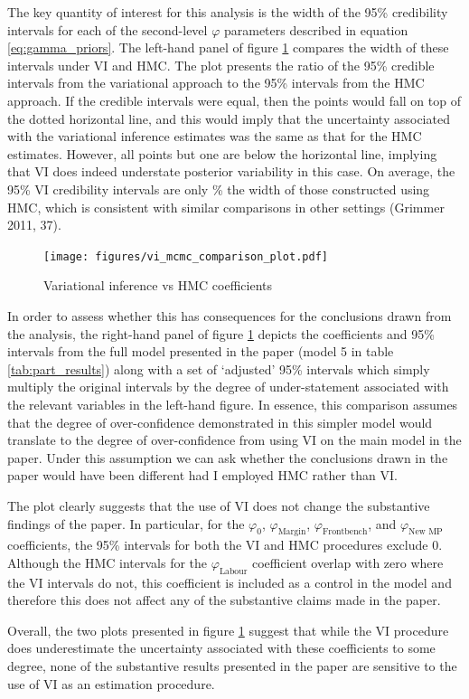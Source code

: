 \documentclass[12pt]{article}
\begin{document}
The key quantity of interest for this analysis is the width of the 95\% credibility intervals for each of the second-level $\varphi$ parameters described in equation \ref{eq:gamma_priors}. The left-hand panel of figure \ref{fig:vi_mcmc} compares the width of these intervals under VI and HMC. The plot presents the ratio of the 95\% credible intervals from the variational approach to the 95\% intervals from the HMC approach. If the credible intervals were equal, then the points would fall on top of the dotted horizontal line, and this would imply that the uncertainty associated with the variational inference estimates was the same as that for the HMC estimates. However, all points but one are below the horizontal line, implying that VI does indeed understate posterior variability in this case. On average, the 95\% VI credibility intervals are only  \% the width of those constructed using HMC, which is consistent with similar comparisons in other settings (Grimmer 2011, 37).

\begin{figure}[h]
\caption{Variational inference vs HMC coefficients}\label{fig:vi_mcmc}
\texttt{[image: figures/vi\_mcmc\_comparison\_plot.pdf]}
\end{figure}

In order to assess whether this has consequences for the conclusions drawn from the analysis, the right-hand panel of figure \ref{fig:vi_mcmc} depicts the coefficients and 95\% intervals from the full model presented in the paper (model 5 in table \ref{tab:part_results}) along with a set of `adjusted' 95\% intervals which simply multiply the original intervals by the degree of under-statement associated with the relevant variables in the left-hand figure. In essence, this comparison assumes that the degree of over-confidence demonstrated in this simpler model would translate to the degree of over-confidence from using VI on the main model in the paper. Under this assumption we can ask whether the conclusions drawn in the paper would have been different had I employed HMC rather than VI.

The plot clearly suggests that the use of VI does not change the substantive findings of the paper. In particular, for the $\varphi_0$, $\varphi_\text{Margin}$, $\varphi_\text{Frontbench}$, and $\varphi_\text{New MP}$ coefficients, the 95\% intervals for both the VI and HMC procedures exclude 0. Although the HMC intervals for the $\varphi_\text{Labour}$ coefficient overlap with zero where the VI intervals do not, this coefficient is included as a control in the model and therefore this does not affect any of the substantive claims made in the paper.

Overall, the two plots presented in figure \ref{fig:vi_mcmc} suggest that while the VI procedure does underestimate the uncertainty associated with these coefficients to some degree, none of the substantive results presented in the paper are sensitive to the use of VI as an estimation procedure.
\end{document}
